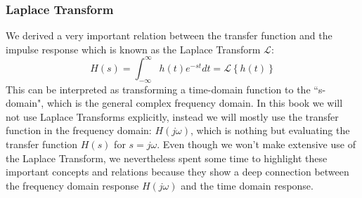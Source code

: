 \subsubsection{Laplace Transform}
 We derived a very important relation between the transfer function and the impulse response which is known as the Laplace Transform $\mathcal{L}$:
    \begin{equation}
        H(s) = \int_{-\infty}^{\infty} h(t) e^{-st} dt = \mathcal{L} \left\{ h(t) \right\}
    \end{equation}
This can be interpreted as transforming a time-domain function to the ``s-domain", which is the general complex frequency domain.  In this book we will not use Laplace Transforms explicitly, instead we will mostly use the transfer function in the frequency domain:  $H(j\omega)$, which is nothing but evaluating the transfer function $H(s)$ for $s=j\omega$.  
Even though we won't make extensive use of the Laplace Transform, we nevertheless spent some time to highlight these important concepts and relations because they show a deep connection between the frequency domain response $H(j\omega)$ and the time domain response.
